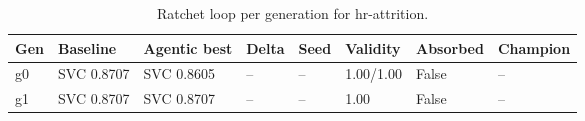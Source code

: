 \begin{table}[H]
\centering\small
\caption{Ratchet loop per generation for hr-attrition.}
\label{tab:ratchet-generations-ratchet-ledger-hr-attrition}
\begin{tabular}{llllllll}
\toprule
Gen & Baseline & Agentic best & Delta & Seed & Validity & Absorbed & Champion \\
\midrule
g0 & SVC 0.8707 & SVC 0.8605 & -- & -- & 1.00/1.00 & False & -- \\
g1 & SVC 0.8707 & SVC 0.8707 & -- & -- & 1.00 & False & -- \\
\bottomrule
\end{tabular}
\end{table}
